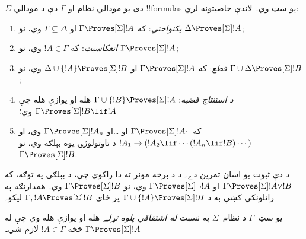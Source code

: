 \documentclass[../../../include/open-logic-section]{subfiles}
\begin{document}


\begin{prop}
  $\Sigma$ دې يو مودالي نظام او $\Gamma$ دې د مودالي
  !!{formula}s يو سټ وي۔ لاندې خاصيتونه لري:
  \begin{enumerate}
  \item{} \emph{يکنواختي}: که
    $\Gamma \Proves[\Sigma] !A$ او $\Gamma \subseteq \Delta$ وي، نو
    $\Delta \Proves[\Sigma] !A$;
  \item{}
    \emph{انعکاسيت}: که $!A \in \Gamma$ وي، نو $\Gamma
    \Proves[\Sigma] !A$;
  \item{} \emph{قطع}: که $\Gamma
    \Proves[\Sigma] !A$ او $\Delta \cup \{!A\} \Proves[\Sigma] !B$
    وي، نو $\Gamma \cup \Delta \Proves[\Sigma] !B$;
  \item{} \emph{د استنتاج قضيه}: $\Gamma \cup \{!B\}
    \Proves[\Sigma] !A$ هله او يوازې هله چې $\Gamma \Proves[\Sigma] !B \lif
      !A$ وي؛
  \item {}%
    که $\Gamma \Proves[\Sigma] !A_1$ او \dots او $\Gamma
    \Proves[\Sigma] !A_n$ وي، او $!A_1 \to (!A_2 \lif \cdots (!A_n \lif
    !B)\cdots)$ د تاوتولوژۍ يوه بېلګه وي، نو $\Gamma
    \Proves[\Sigma] !B$.
  \end{enumerate}
\end{prop}

د دې ثبوت يو اسان تمرين دے۔ د
 د
 برخه مونږ ته دا راکوي چې، د بېلګې
په توګه، که $\Gamma \Proves[\Sigma] !A \lor !B$
او $\Gamma \Proves[\Sigma] \lnot !A$ وي، نو $\Gamma \Proves[\Sigma]
!B$ وي۔ همدارنګه په راتلونکي کښې به د
$\Gamma \cup \{ !A\} \Proves[\Sigma] !B$ پر ځای
$\Gamma, !A \Proves[\Sigma] !B$ ليکو۔

\begin{defn}
  يو سټ~$\Gamma$ د نظام~$\Sigma$ په نسبت \emph{له اشتقاقي پلوه تړلے} هله
  او يوازې هله وي چې له $\Gamma \Proves[\Sigma] !A$ څخه
  $!A \in \Gamma$ لازم شي۔
\end{defn}
\end{document}
